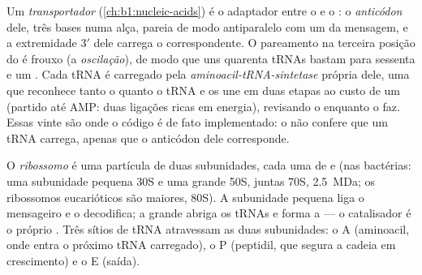 \begin{definition}\label{def:b1:gene-expression:trna}
Um \emph{ transportador} (\cref{ch:b1:nucleic-acids}) é o adaptador
entre o  e o : o \emph{anticódon} dele, três bases numa
alça, pareia de modo antiparalelo com um  da mensagem, e a
extremidade $3'$ dele carrega o  correspondente. O pareamento
na terceira posição do  é frouxo (a \emph{oscilação}), de modo que
uns quarenta tRNAs bastam para sessenta e um . Cada tRNA é
carregado pela \emph{aminoacil-tRNA-sintetase} própria dele, uma 
que reconhece tanto o  quanto o tRNA e os une em duas etapas
ao custo de um  (partido até AMP: duas ligações ricas em energia),
revisando o  enquanto o faz. Essas vinte  são onde o
código é de fato implementado: o  não confere que  um
tRNA carrega, apenas que o anticódon dele corresponde.
\end{definition}

\begin{definition}[O ribossomo]\label{def:b1:gene-expression:ribosome}
O \emph{ribossomo} é uma partícula de duas subunidades, cada uma de  e  (nas bactérias: uma subunidade pequena 30S e uma
grande 50S, juntas 70S, \qty{2.5}{MDa}; os ribossomos eucarióticos são
maiores, 80S). A subunidade pequena liga o mensageiro e o decodifica; a
grande abriga os tRNAs e forma a  --- o catalisador é o
próprio . Três sítios de tRNA atravessam as duas
subunidades: o A (aminoacil, onde entra o próximo tRNA carregado), o P
(peptidil, que segura a cadeia em crescimento) e o E (saída).
\end{definition}

